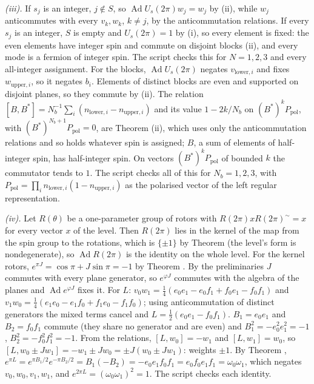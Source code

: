 \emph{(iii).} If $s_{j}$ is an integer, $j \notin S$, so $\operatorname{Ad}U_{s}(2\pi)w_{j} = w_{j}$ by (ii), while $w_{j}$ anticommutes with every $v_{k}, w_{k}$, $k \ne j$, by the anticommutation relations. If every $s_{j}$ is an integer, $S$ is empty and $U_{s}(2\pi) = 1$ by (i), so every element is fixed: the even elements have integer spin and commute on disjoint blocks (ii), and every mode is a fermion of integer spin. The script checks this for $N = 1, 2, 3$ and every all-integer assignment. For the blocks, $\operatorname{Ad}U_{s}(2\pi)$ negates $v_{\mathrm{lower},i}$ and fixes $w_{\mathrm{upper},i}$, so it negates $b_{i}$. Elements of distinct blocks are even and supported on disjoint planes, so they commute by (ii). The relation $[B, B^{*}] = N_{b}^{-1}\sum_{i}(n_{\mathrm{lower},i} - n_{\mathrm{upper},i})$ and its value $1 - 2k/N_{b}$ on $(B^{*})^{k}P_{\mathrm{pol}}$, with $(B^{*})^{N_{b}+1}P_{\mathrm{pol}} = 0$, are Theorem (ii), which uses only the anticommutation relations and so holds whatever spin is assigned; $B$, a sum of elements of half-integer spin, has half-integer spin. On vectors $(B^{*})^{k}P_{\mathrm{pol}}$ of bounded $k$ the commutator tends to $1$. The script checks all of this for $N_{b} = 1, 2, 3$, with $P_{\mathrm{pol}} = \prod_{i}n_{\mathrm{lower},i}(1 - n_{\mathrm{upper},i})$ as the polarised vector of the left regular representation.

\emph{(iv).} Let $R(\theta)$ be a one-parameter group of rotors with $R(2\pi)xR(2\pi)^{\sim} = x$ for every vector $x$ of the level. Then $R(2\pi)$ lies in the kernel of the map from the spin group to the rotations, which is $\{\pm1\}$ by Theorem  (the level's form is nondegenerate), so $\operatorname{Ad}R(2\pi)$ is the identity on the whole level. For the kernel rotors, $e^{\pi J} = \cos\pi + J\sin\pi = -1$ by Theorem . By the preliminaries $J$ commutes with every plane generator, so $e^{\varphi J}$ commutes with the algebra of the planes and $\operatorname{Ad}e^{\varphi J}$ fixes it. For $L$: $v_{0}w_{1} = \tfrac14(e_{0}e_{1} - e_{0}f_{1} + f_{0}e_{1} - f_{0}f_{1})$ and $v_{1}w_{0} = \tfrac14(e_{1}e_{0} - e_{1}f_{0} + f_{1}e_{0} - f_{1}f_{0})$; using anticommutation of distinct generators the mixed terms cancel and $L = \tfrac12(e_{0}e_{1} - f_{0}f_{1})$. $B_{1} = e_{0}e_{1}$ and $B_{2} = f_{0}f_{1}$ commute (they share no generator and are even) and $B_{1}^{2} = -e_{0}^{2}e_{1}^{2} = -1$, $B_{2}^{2} = -f_{0}^{2}f_{1}^{2} = -1$. From the relations, $[L, w_{0}] = -w_{1}$ and $[L, w_{1}] = w_{0}$, so $[L, w_{0} \pm Jw_{1}] = -w_{1} \pm Jw_{0} = \pm J(w_{0} \pm Jw_{1})$: weights $\pm1$. By Theorem , $e^{\pi L} = e^{\pi B_{1}/2}e^{-\pi B_{2}/2} = B_{1}(-B_{2}) = -e_{0}e_{1}f_{0}f_{1} = e_{0}f_{0}e_{1}f_{1} = \omega_{0}\omega_{1}$, which negates $v_{0}, w_{0}, v_{1}, w_{1}$, and $e^{2\pi L} = (\omega_{0}\omega_{1})^{2} = 1$. The script checks each identity.

